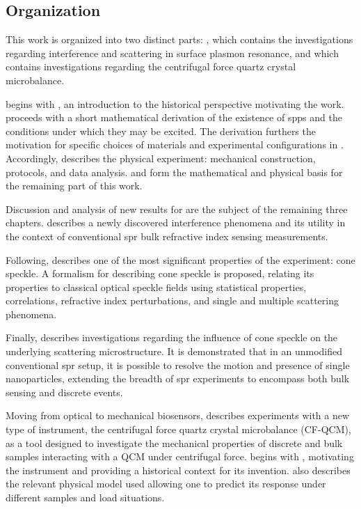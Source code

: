 \subsection*{Organization}

This work is organized into two distinct parts: , which
contains the investigations regarding interference and scattering in surface
plasmon resonance, and  which contains investigations regarding
the centrifugal force quartz crystal microbalance.

 begins with , an introduction to the
historical perspective motivating the work.   proceeds
with a short mathematical derivation of the existence of \glspl{spp} and the
conditions under which they may be excited.  The derivation furthers the
motivation for specific choices of materials and experimental configurations
in .  Accordingly, 
describes the physical experiment: mechanical construction, protocols, and
data analysis.   and  form the
mathematical and physical basis for the remaining part of this work.

Discussion and analysis of new results for  are the subject of
the remaining three chapters.   describes a newly
discovered interference phenomena and its utility in the context of
conventional \gls{spr} bulk refractive index sensing measurements.

Following,  describes one of the most significant
properties of the experiment: cone speckle.  A formalism for describing cone
speckle is proposed, relating its properties to classical optical speckle
fields using statistical properties, correlations, refractive index
perturbations, and single and multiple scattering phenomena.

Finally,  describes investigations regarding the
influence of cone speckle on the underlying scattering microstructure.  It is
demonstrated that in an unmodified conventional \gls{spr} setup, it is possible to
resolve the motion and presence of single nanoparticles, extending the breadth
of \gls{spr} experiments to encompass both bulk sensing and discrete events.

Moving from optical to mechanical biosensors,  describes
experiments with a new type of instrument, the centrifugal force quartz
crystal microbalance (CF-QCM), as a tool designed to investigate the
mechanical properties of discrete and bulk samples interacting with a QCM
under centrifugal force.   begins with
, motivating the instrument and providing
a historical context for its invention.   also
describes the relevant physical model used allowing one to predict its
response under different samples and load situations.

